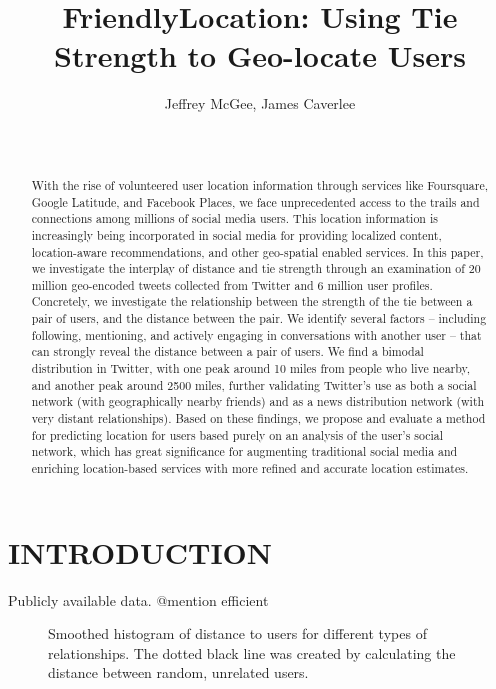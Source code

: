 \documentclass{sig-alternate}
\title{FriendlyLocation: Using Tie Strength to Geo-locate Users
}
\author{
    \alignauthor Jeffrey McGee, James Caverlee\\
    \affaddr{Department of Computer Science and Engineering, Texas A\&M
    University} \\
    \affaddr{ College Station, TX 77845 USA} \\
    \email{jeffamcgee@tamu.edu, caverlee@cse.tamu.edu}
}
\begin{document}
\maketitle
\begin{abstract}
With the rise of volunteered user location information through services like
Foursquare, Google Latitude, and Facebook Places, we face unprecedented access
to the trails and connections among millions of social media users. This
location information is increasingly being incorporated in social media for
providing localized content, location-aware recommendations, and other
geo-spatial enabled services. In this paper, we investigate the interplay of
distance and tie strength through an examination of 20 million geo-encoded
tweets collected from Twitter and 6 million user profiles. Concretely, we
investigate the relationship between the strength of the tie between a pair of
users, and the distance between the pair. We identify several factors --
including following, mentioning, and actively engaging in conversations with
another user -- that can strongly reveal the distance between a pair of users.
We find a bimodal distribution in Twitter, with one peak around 10 miles from
people who live nearby, and another peak around 2500 miles, further validating
Twitter's use as both a social network (with geographically nearby friends) and
as a news distribution network (with very distant relationships). Based on
these findings, we propose and evaluate a method for predicting location for
users based purely on an analysis of the user's social network, which has great
significance for augmenting traditional social media and enriching
location-based services with more refined and accurate location estimates.

\end{abstract}




\section{INTRODUCTION}



Publicly available data.
@mention
efficient

\begin{figure}
\centering
{}
\caption{
Smoothed histogram of distance to users for different types of relationships.
The dotted black line was created by calculating the distance between random, unrelated users.
}
\label{fig:EdgeTypes}
\end{figure}
\end{document}
